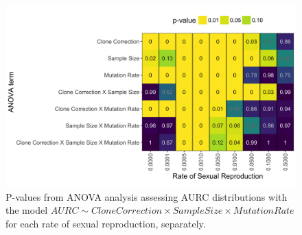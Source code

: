 \documentclass[double,11pt]{beavtex}
\begin{document}
  \newpage
  
  \begin{figure}
  
  {\centering \includegraphics[width=1\linewidth]{figure/simulations/AURC_ANOVA} 
  
  }
  
  \caption[P-values from ANOVA analysis assessing AURC distributions with the 
  model $AURC \sim Clone Correction \times Sample Size \times Mutation Rate$
  for each rate of sexual reproduction, separately.]{P-values from ANOVA analysis assessing AURC distributions with the model
  \(AURC \sim Clone Correction \times Sample Size \times Mutation Rate\)
  for each rate of sexual reproduction, separately.}\label{fig:sim3}
  \end{figure}
  
\end{document}
